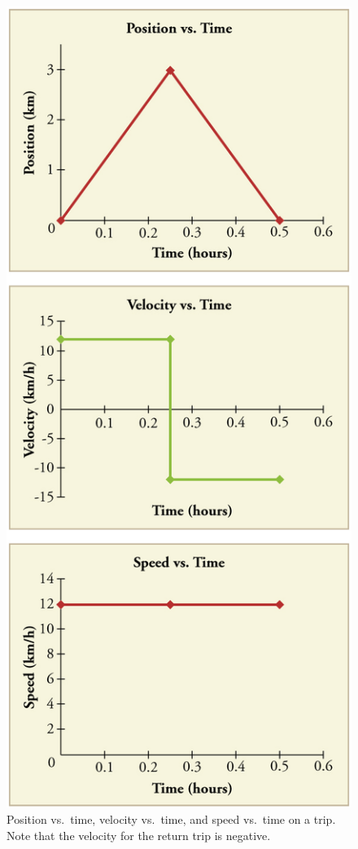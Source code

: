 \documentclass[
]{book}
\begin{document}
\begin{figure}
\hypertarget{import-auto-id1806646}{%
\centering
\includegraphics{images/Figure_02_02_03.jpg}
\caption{Position vs.~time, velocity vs.~time, and speed vs.~time on a trip.
Note that the velocity for the return trip is
negative.}\label{import-auto-id1806646}
}
\end{figure}
\end{document}

